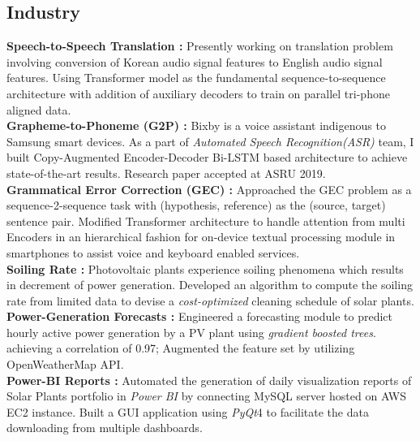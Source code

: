 \documentclass[11pt,a4paper,sans]{moderncv}        %
\begin{document}
\subsection{Industry}
{\textbf{Speech-to-Speech Translation :} Presently working on translation problem involving conversion of Korean audio signal features to English audio signal features. Using Transformer model as the fundamental sequence-to-sequence architecture with addition of auxiliary decoders to train on parallel tri-phone aligned data.
\vspace{3} \\ 
\textbf{Grapheme-to-Phoneme (G2P) :} Bixby is a voice assistant indigenous to Samsung smart devices. As a part of \textit{Automated Speech Recognition(ASR)} team, I built Copy-Augmented Encoder-Decoder Bi-LSTM based architecture to achieve state-of-the-art results. Research paper accepted at ASRU 2019.
\vspace{3} \\ 
\textbf{Grammatical Error Correction (GEC) :} Approached the GEC problem as a sequence-2-sequence task with (hypothesis, reference) as the (source, target) sentence pair. Modified Transformer architecture to handle attention from multi Encoders in an hierarchical fashion for on-device textual processing module in smartphones to assist voice and keyboard enabled services. \\}
{\textbf{Soiling Rate :} Photovoltaic plants experience soiling phenomena which results in decrement of power generation. Developed an algorithm to compute the soiling rate from limited data to devise a \textit{cost-optimized} cleaning schedule of solar plants.
\vspace{3} \\ 
\textbf{Power-Generation Forecasts : }Engineered a forecasting module to predict hourly active power generation by a PV plant using \textit{gradient boosted trees}. achieving a correlation of 0.97; Augmented the feature set by utilizing OpenWeatherMap API.
\vspace{3} \\ 
\textbf{Power-BI Reports : }Automated the generation of daily visualization reports of Solar Plants portfolio in \textit{Power BI} by connecting MySQL server hosted on AWS EC2 instance. Built a GUI application using \textit{PyQt}4 to facilitate the data downloading from multiple dashboards. \\
}
\end{document}

